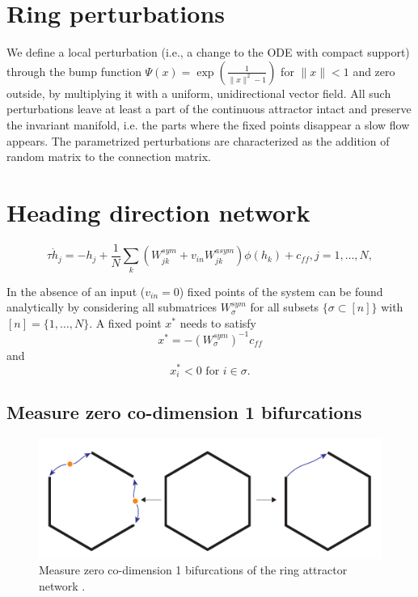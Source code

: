 \documentclass{article} %
\newcounter{ct}
\theoremstyle{definition}
\theoremstyle{remark}
\begin{document}
\newpage
\section{Ring perturbations}\label{sec:supp:ring_perturbations}

We define a local perturbation (i.e., a change to the ODE with compact support) through the bump function $\Psi(x) = \exp\left(\frac{1}{\|x\|^2-1}\right)$ for $\|x\|<1$ and zero outside, by multiplying it with a uniform, unidirectional vector field. All such perturbations leave at least a part of the continuous attractor intact and preserve the invariant manifold, i.e. the parts where the fixed points disappear a slow flow appears.
The parametrized perturbations are characterized as the addition of random matrix to the connection matrix. 



\section{Heading direction network}\label{sec:supp:headdirection}

\begin{equation}
\tau \dot h_j = -h_j + \frac{1}{N} \sum_k (W^{sym}_{jk} + v_{in} W^{asym}_{jk})\phi(h_k)+c_{ff},     j=1,\dots,N,
\end{equation}

In the absence of an input ($v_{in}=0$) fixed points of the system can be found analytically by considering all submatrices $W^{sym}_\sigma$ for all subsets $\{\sigma\subset [n]\}$ with$[n]=\{1,\dots, N\}$.
A fixed point $x^*$ needs to satisfy
\begin{equation}
x^*= -(W^{sym}_\sigma)^{-1}c_{ff}
\end{equation}
and 
\begin{equation}
x^*_i<0 \text{   for  	 } i\in\sigma.
\end{equation}


\subsection{Measure zero co-dimension 1 bifurcations}

\begin{figure}[tbhp]
     \centering
    \includegraphics[width=\textwidth]{ring_n6_perturbations_schematic}
       \caption{Measure zero co-dimension 1 bifurcations of the ring attractor network \citep{Noorman2022}.}
         \label{fig:meaure_zero_perturbations}
\end{figure}
\end{document}

